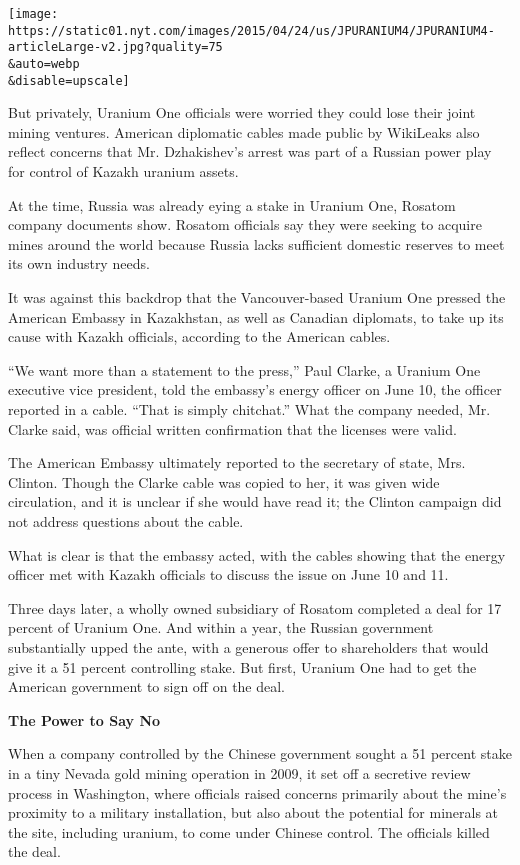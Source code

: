 \texttt{[image: https://static01.nyt.com/images/2015/04/24/us/JPURANIUM4/JPURANIUM4-articleLarge-v2.jpg?quality=75\\\&auto=webp\\\&disable=upscale]}

But privately, Uranium One officials were worried they could lose their
joint mining ventures. American diplomatic cables made public by
WikiLeaks also reflect concerns that Mr. Dzhakishev's arrest was part of
a Russian power play for control of Kazakh uranium assets.

At the time, Russia was already eying a stake in Uranium One, Rosatom
company documents show. Rosatom officials say they were seeking to
acquire mines around the world because Russia lacks sufficient domestic
reserves to meet its own industry needs.

It was against this backdrop that the Vancouver-based Uranium One
pressed the American Embassy in Kazakhstan, as well as Canadian
diplomats, to take up its cause with Kazakh officials, according to the
American cables.

``We want more than a statement to the press,'' Paul Clarke, a Uranium
One executive vice president, told the embassy's energy officer on June
10, the officer reported in a cable. ``That is simply chitchat.'' What
the company needed, Mr. Clarke said, was official written confirmation
that the licenses were valid.

The American Embassy ultimately reported to the secretary of state, Mrs.
Clinton. Though the Clarke cable was copied to her, it was given wide
circulation, and it is unclear if she would have read it; the Clinton
campaign did not address questions about the cable.

What is clear is that the embassy acted, with the cables showing that
the energy officer met with Kazakh officials to discuss the issue on
June 10 and 11.

Three days later, a wholly owned subsidiary of Rosatom completed a deal
for 17 percent of Uranium One. And within a year, the Russian government
substantially upped the ante, with a generous offer to shareholders that
would give it a 51 percent controlling stake. But first, Uranium One had
to get the American government to sign off on the deal.

\textbf{The Power to Say No}

When a company controlled by the Chinese government sought a 51 percent
stake in a tiny Nevada gold mining operation in 2009, it set off a
secretive review process in Washington, where officials raised concerns
primarily about the mine's proximity to a military installation, but
also about the potential for minerals at the site, including uranium, to
come under Chinese control. The officials killed the deal.

